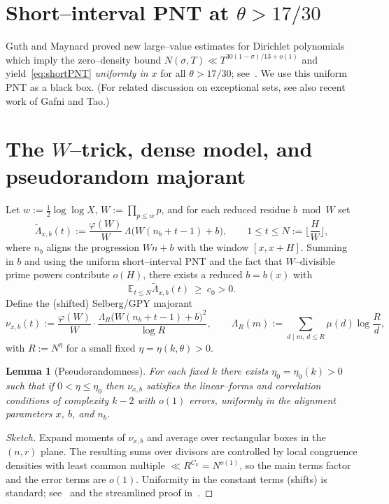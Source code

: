 \documentclass[11pt]{amsart}
\newtheorem{lemma}[theorem]{Lemma}
\theoremstyle{definition}
\theoremstyle{remark}
\numberwithin{equation}{section}
\begin{document}
\section{Short--interval PNT at $\theta>17/30$}\label{subsec:PNT}
Guth and Maynard proved new large--value estimates for Dirichlet polynomials which imply the zero--density bound $N(\sigma,T)\ll T^{30(1-\sigma)/13+o(1)}$ and yield~\eqref{eq:shortPNT} \emph{uniformly in $x$} for all $\theta>17/30$; see~\cite{GuthMaynardAnnals,GuthMaynardArxiv}. We use this uniform PNT as a black box. (For related discussion on exceptional sets, see also recent work of Gafni and Tao.)

\section{The $W$--trick, dense model, and pseudorandom majorant}\label{sec:Wtrick}
Let $w:=\tfrac12\log\log X$, $W:=\prod_{p\le w}p$, and for each reduced residue $b\bmod W$ set
\[
\tilde\Lambda_{x,b}(t):=\frac{\varphi(W)}{W}\,\Lambda\bigl(W(n_b+t-1)+b\bigr),\qquad 1\le t\le N:=\Big\lfloor\frac{H}{W}\Big\rfloor,
\]
where $n_b$ aligns the progression $Wn+b$ with the window $[x,x+H]$.
Summing in $b$ and using the uniform short--interval PNT and the fact that $W$--divisible prime powers contribute $o(H)$, there exists a reduced $b=b(x)$ with
\begin{equation}\label{eq:meanpositive}
\mathbb E_{t\le N}\tilde\Lambda_{x,b}(t)\ \ge\ c_0>0.
\end{equation}
Define the (shifted) Selberg/GPY majorant
\[
\nu_{x,b}(t):=\frac{\varphi(W)}{W}\cdot \frac{\Lambda_R\bigl(W(n_b+t-1)+b\bigr)^2}{\log R},\qquad \Lambda_R(m):=\sum_{d\mid m,\, d\le R}\mu(d)\log\frac{R}{d},
\]
with $R:=N^\eta$ for a small fixed $\eta=\eta(k,\theta)>0$.

\begin{lemma}[Pseudorandomness]\label{lem:pseudo}
For each fixed $k$ there exists $\eta_0=\eta_0(k)>0$ such that if $0<\eta\le\eta_0$ then $\nu_{x,b}$ satisfies the linear–forms and correlation conditions of complexity $k-2$ with $o(1)$ errors, uniformly in the alignment parameters $x$, $b$, and $n_b$.
\end{lemma}

\begin{proof}[Sketch]
Expand moments of $\nu_{x,b}$ and average over rectangular boxes in the $(n,r)$ plane. The resulting sums over divisors are controlled by local congruence densities with least common multiple $\ll R^{C_k}=N^{o(1)}$, so the main terms factor and the error terms are $o(1)$. Uniformity in the constant terms (shifts) is standard; see~\cite[\S 9,\ Thm.~3.18]{GreenTao08} and the streamlined proof in~\cite{CFZ13}.
\end{proof}
\end{document}
